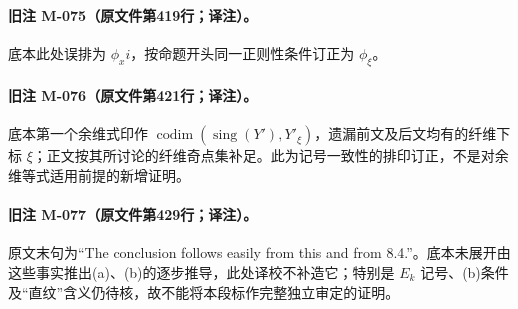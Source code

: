 \paragraph{旧注 M-075（原文件第419行；译注）。}
底本此处误排为 $\phi_{x}i$，按命题开头同一正则性条件订正为 $\phi_\xi$。

\paragraph{旧注 M-076（原文件第421行；译注）。}
底本第一个余维式印作 $\operatorname{codim}(\operatorname{sing}(Y'),Y'_\xi)$，遗漏前文及后文均有的纤维下标 $\xi$；正文按其所讨论的纤维奇点集补足。此为记号一致性的排印订正，不是对余维等式适用前提的新增证明。

\paragraph{旧注 M-077（原文件第429行；译注）。}
原文末句为“The conclusion follows easily from this and from 8.4.”。底本未展开由这些事实推出(a)、(b)的逐步推导，此处译校不补造它；特别是 $E_k$ 记号、(b)条件及“直纹”含义仍待核，故不能将本段标作完整独立审定的证明。

\endgroup
